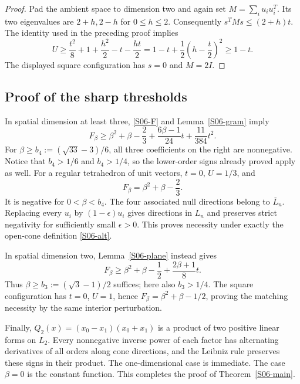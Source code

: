 \documentclass[11pt,a4paper]{article}
\theoremstyle{definition}\newtheorem{definition}[theorem]{Definition}
\theoremstyle{remark}\newtheorem{remark}[theorem]{Remark}
\numberwithin{equation}{section}
\begin{document}
\begin{proof}
Pad the ambient space to dimension two and again set $M=\sum_i u_i u_i^T$. Its two eigenvalues are $2+h,2-h$ for $0\le h\le2$. Consequently $s^TMs\le(2+h)t$. The identity used in the preceding proof implies
\[
 U\ge\frac{t^2}{8}+1+\frac{h^2}{2}-t-\frac{ht}{2}
 =1-t+\frac12\left(h-\frac t2\right)^2\ge1-t.
\]
The displayed square configuration has $s=0$ and $M=2I$.
\end{proof}

\subsection{Proof of the sharp thresholds}\label{S06-sec-4}
In spatial dimension at least three, \eqref{S06-F} and Lemma~\ref{S06-gram} imply
\begin{equation}\label{S06-lower}
 F_\beta\ge\beta^2+\beta-\frac23
 +\frac{6\beta-1}{24}t+\frac{11}{384}t^2.
\end{equation}
For $\beta\ge b_4:=(\sqrt{33}-3)/6$, all three coefficients on the right are nonnegative. Notice that $b_4>1/6$ and $b_4>1/4$, so the lower-order signs already proved apply as well. For a regular tetrahedron of unit vectors, $t=0$, $U=1/3$, and
\[
 F_\beta=\beta^2+\beta-\frac23.
\]
It is negative for $0<\beta<b_4$. The four associated null directions belong to $\overline L_n$. Replacing every $u_i$ by $(1-\epsilon)u_i$ gives directions in $L_n$ and preserves strict negativity for sufficiently small $\epsilon>0$. This proves necessity under exactly the open-cone definition \eqref{S06-alt}.

In spatial dimension two, Lemma~\ref{S06-plane} instead gives
\[
 F_\beta\ge\beta^2+\beta-\frac12+\frac{2\beta+1}{8}t.
\]
Thus $\beta\ge b_3:=(\sqrt3-1)/2$ suffices; here also $b_3>1/4$. The square configuration has $t=0$, $U=1$, hence $F_\beta=\beta^2+\beta-1/2$, proving the matching necessity by the same interior perturbation.

Finally, $Q_2(x)=(x_0-x_1)(x_0+x_1)$ is a product of two positive linear forms on $L_2$. Every nonnegative inverse power of each factor has alternating derivatives of all orders along cone directions, and the Leibniz rule preserves these signs in their product. The one-dimensional case is immediate. The case $\beta=0$ is the constant function. This completes the proof of Theorem~\ref{S06-main}.
\end{document}

